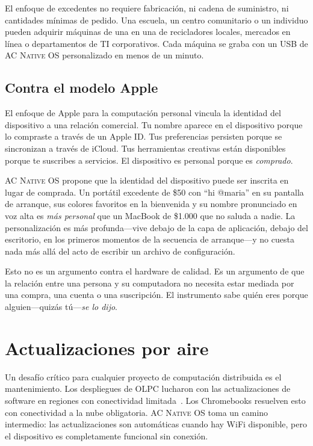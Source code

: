 \documentclass[10pt,letterpaper,twocolumn]{article}
\newcommand{\acos}{\textsc{AC Native OS}}
\begin{document}
El enfoque de excedentes no requiere fabricación, ni cadena de suministro, ni cantidades mínimas de pedido. Una escuela, un centro comunitario o un individuo pueden adquirir máquinas de una en una de recicladores locales, mercados en línea o departamentos de TI corporativos. Cada máquina se graba con un USB de \acos{} personalizado en menos de un minuto.

\subsection{Contra el modelo Apple}

El enfoque de Apple para la computación personal vincula la identidad del dispositivo a una relación comercial. Tu nombre aparece en el dispositivo porque lo compraste a través de un Apple ID. Tus preferencias persisten porque se sincronizan a través de iCloud. Tus herramientas creativas están disponibles porque te suscribes a servicios. El dispositivo es personal porque es \emph{comprado}.

\acos{} propone que la identidad del dispositivo puede ser inscrita en lugar de comprada. Un portátil excedente de \$50 con ``hi @maria'' en su pantalla de arranque, sus colores favoritos en la bienvenida y su nombre pronunciado en voz alta es \emph{más personal} que un MacBook de \$1.000 que no saluda a nadie. La personalización es más profunda---vive debajo de la capa de aplicación, debajo del escritorio, en los primeros momentos de la secuencia de arranque---y no cuesta nada más allá del acto de escribir un archivo de configuración.

Esto no es un argumento contra el hardware de calidad. Es un argumento de que la relación entre una persona y su computadora no necesita estar mediada por una compra, una cuenta o una suscripción. El instrumento sabe quién eres porque alguien---quizás tú---\emph{se lo dijo}.

\section{Actualizaciones por aire}
\label{sec:ota}

Un desafío crítico para cualquier proyecto de computación distribuida es el mantenimiento. Los despliegues de OLPC lucharon con las actualizaciones de software en regiones con conectividad limitada~\citep{warschauer2004technology}. Los Chromebooks resuelven esto con conectividad a la nube obligatoria. \acos{} toma un camino intermedio: las actualizaciones son automáticas cuando hay WiFi disponible, pero el dispositivo es completamente funcional sin conexión.
\end{document}
